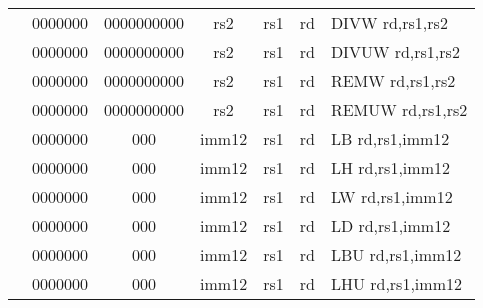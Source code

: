 \begin{table}[p]
\begin{small}
\begin{center}
\begin{tabular}{rcccccccccl}
&
\multicolumn{1}{|c|}{0000000} &
\multicolumn{5}{c|}{0000000000} &
\multicolumn{1}{c|}{rs2} &
\multicolumn{1}{c|}{rs1} &
\multicolumn{1}{c|}{rd} & DIVW rd,rs1,rs2 \\
\cline{2-10}
  

&
\multicolumn{1}{|c|}{0000000} &
\multicolumn{5}{c|}{0000000000} &
\multicolumn{1}{c|}{rs2} &
\multicolumn{1}{c|}{rs1} &
\multicolumn{1}{c|}{rd} & DIVUW rd,rs1,rs2 \\
\cline{2-10}
  

&
\multicolumn{1}{|c|}{0000000} &
\multicolumn{5}{c|}{0000000000} &
\multicolumn{1}{c|}{rs2} &
\multicolumn{1}{c|}{rs1} &
\multicolumn{1}{c|}{rd} & REMW rd,rs1,rs2 \\
\cline{2-10}
  

&
\multicolumn{1}{|c|}{0000000} &
\multicolumn{5}{c|}{0000000000} &
\multicolumn{1}{c|}{rs2} &
\multicolumn{1}{c|}{rs1} &
\multicolumn{1}{c|}{rd} & REMUW rd,rs1,rs2 \\
\cline{2-10}
  

&
\multicolumn{1}{|c|}{0000000} &
\multicolumn{2}{c|}{000} &
\multicolumn{4}{c|}{imm12} &
\multicolumn{1}{c|}{rs1} &
\multicolumn{1}{c|}{rd} & LB rd,rs1,imm12 \\
\cline{2-10}
  

&
\multicolumn{1}{|c|}{0000000} &
\multicolumn{2}{c|}{000} &
\multicolumn{4}{c|}{imm12} &
\multicolumn{1}{c|}{rs1} &
\multicolumn{1}{c|}{rd} & LH rd,rs1,imm12 \\
\cline{2-10}
  

&
\multicolumn{1}{|c|}{0000000} &
\multicolumn{2}{c|}{000} &
\multicolumn{4}{c|}{imm12} &
\multicolumn{1}{c|}{rs1} &
\multicolumn{1}{c|}{rd} & LW rd,rs1,imm12 \\
\cline{2-10}
  

&
\multicolumn{1}{|c|}{0000000} &
\multicolumn{2}{c|}{000} &
\multicolumn{4}{c|}{imm12} &
\multicolumn{1}{c|}{rs1} &
\multicolumn{1}{c|}{rd} & LD rd,rs1,imm12 \\
\cline{2-10}
  

&
\multicolumn{1}{|c|}{0000000} &
\multicolumn{2}{c|}{000} &
\multicolumn{4}{c|}{imm12} &
\multicolumn{1}{c|}{rs1} &
\multicolumn{1}{c|}{rd} & LBU rd,rs1,imm12 \\
\cline{2-10}
  

&
\multicolumn{1}{|c|}{0000000} &
\multicolumn{2}{c|}{000} &
\multicolumn{4}{c|}{imm12} &
\multicolumn{1}{c|}{rs1} &
\multicolumn{1}{c|}{rd} & LHU rd,rs1,imm12 \\
\cline{2-10}
  


\end{tabular}
\end{center}
\end{small}
\end{table}
